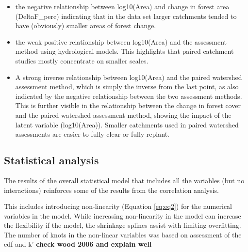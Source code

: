 \documentclass[]{elsarticle} %
\providecommand{\tightlist}{%
  \setlength{\itemsep}{0pt}\setlength{\parskip}{0pt}}
\begin{document}
\begin{itemize}
\tightlist
\item
  the negative relationship between log10(Area) and change in forest area (DeltaF\_perc) indicating that in the data set larger catchments tended to have (obviously) smaller areas of forest change.\\
\item
  the weak positive relationship between log10(Area) and the assessment method using hydrological models. This highlights that paired catchment studies mostly concentrate on smaller scales.\\
\item
  A strong inverse relationship between log10(Area) and the paired watershed assessment method, which is simply the inverse from the last point, as also indicated by the negative relationship between the two assessment methods. This is further visible in the relationship between the change in forest cover and the paired watershed assessment method, showing the impact of the latent variable (log10(Area)). Smaller catchments used in paired watershed assessments are easier to fully clear or fully replant.
\end{itemize}

\hypertarget{statistical-analysis}{%
\subsection{Statistical analysis}\label{statistical-analysis}}

The results of the overall statistical model that includes all the variables (but no interactions) reinforces some of the results from the correlation analysis.

This includes introducing non-linearity (Equation \eqref{eq:eq2}) for the numerical variables in the model. While increasing non-linearity in the model can increase the flexibility if the model, the shrinkage splines assist with limiting overfitting. The number of knots in the non-linear variables was based on assessment of the edf and k' \textbf{check wood 2006 and explain well}
\end{document}
